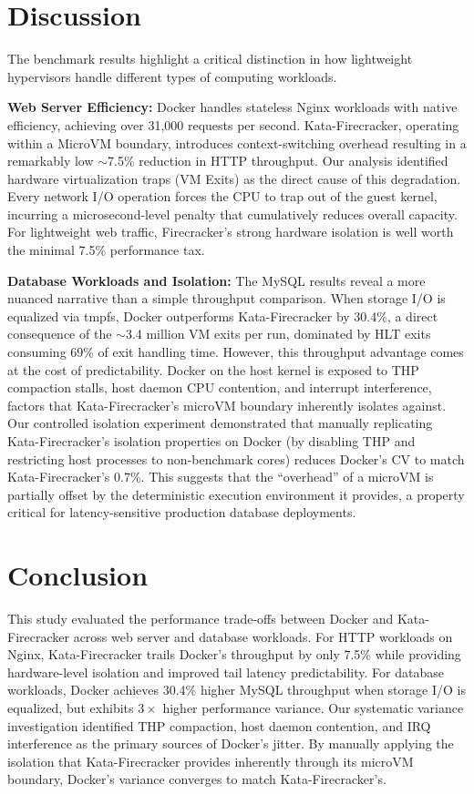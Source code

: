 \documentclass[conference]{IEEEtran}
\begin{document}
\section{Discussion}
The benchmark results highlight a critical distinction in how lightweight hypervisors handle different types of computing workloads.

\textbf{Web Server Efficiency:} Docker handles stateless Nginx workloads with native efficiency, achieving over 31,000 requests per second. Kata-Firecracker, operating within a MicroVM boundary, introduces context-switching overhead resulting in a remarkably low $\sim$7.5\% reduction in HTTP throughput. Our analysis identified hardware virtualization traps (VM Exits) as the direct cause of this degradation. Every network I/O operation forces the CPU to trap out of the guest kernel, incurring a microsecond-level penalty that cumulatively reduces overall capacity. For lightweight web traffic, Firecracker's strong hardware isolation is well worth the minimal 7.5\% performance tax.

\textbf{Database Workloads and Isolation:} The MySQL results reveal a more nuanced narrative than a simple throughput comparison. When storage I/O is equalized via tmpfs, Docker outperforms Kata-Firecracker by 30.4\%, a direct consequence of the $\sim$3.4 million VM exits per run, dominated by HLT exits consuming 69\% of exit handling time. However, this throughput advantage comes at the cost of predictability. Docker on the host kernel is exposed to THP compaction stalls, host daemon CPU contention, and interrupt interference, factors that Kata-Firecracker's microVM boundary inherently isolates against. Our controlled isolation experiment demonstrated that manually replicating Kata-Firecracker's isolation properties on Docker (by disabling THP and restricting host processes to non-benchmark cores) reduces Docker's CV to match Kata-Firecracker's 0.7\%. This suggests that the ``overhead'' of a microVM is partially offset by the deterministic execution environment it provides, a property critical for latency-sensitive production database deployments.

\section{Conclusion}
This study evaluated the performance trade-offs between Docker and Kata-Firecracker across web server and database workloads. For HTTP workloads on Nginx, Kata-Firecracker trails Docker's throughput by only 7.5\% while providing hardware-level isolation and improved tail latency predictability. For database workloads, Docker achieves 30.4\% higher MySQL throughput when storage I/O is equalized, but exhibits $3{\times}$ higher performance variance. Our systematic variance investigation identified THP compaction, host daemon contention, and IRQ interference as the primary sources of Docker's jitter. By manually applying the isolation that Kata-Firecracker provides inherently through its microVM boundary, Docker's variance converges to match Kata-Firecracker's.
\end{document}
